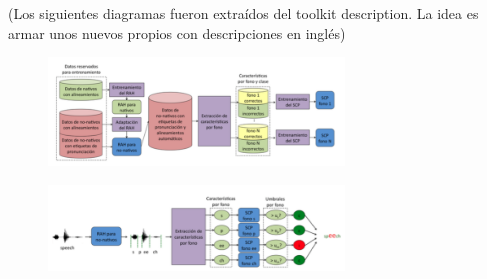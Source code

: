 (Los siguientes diagramas fueron extraídos del toolkit description. 
La idea es armar unos nuevos propios con descripciones en inglés)

\begin{figure}[H]
	\centering
	\includegraphics[width=0.7\textwidth]{files/figures/experimental_design/diagrama-1.png}
\end{figure}

\begin{figure}[H]
	\centering
	\includegraphics[width=0.7\textwidth]{files/figures/experimental_design/diagrama-2.png}
\end{figure}

